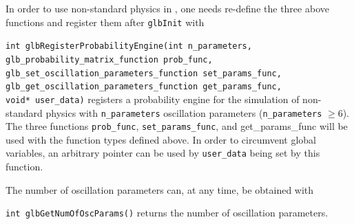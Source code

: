 In order to use non-standard physics in \GLOBES , one needs re-define the three above functions and register them after {\tt glbInit} with
\begin{function}
{\tt int glbRegisterProbabilityEngine(int n\_parameters,
                 glb\_probability\_matrix\_function prob\_func, \\
                 glb\_set\_oscillation\_parameters\_function set\_params\_func, \\
                 glb\_get\_oscillation\_parameters\_function get\_params\_func, \\
                 void* user\_data)} registers a probability
engine for the simulation of non-standard physics with {\tt n\_parameters} oscillation parameters ({\tt n\_parameters} $\ge6$). The three functions {\tt prob\_func}, {\tt set\_params\_func}, and {get\_params\_func} 
will be used with the function types defined above. In order to circumvent global variables, an arbitrary pointer can be used by {\tt user\_data} being set by this function.
\end{function}
The number of oscillation parameters can, at any time, be obtained with
\begin{function}
{\tt  int glbGetNumOfOscParams()} returns the number of oscillation parameters.
\end{function}

